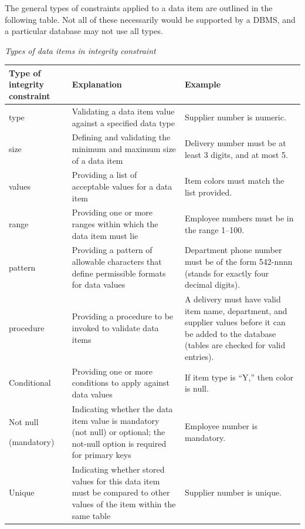 \documentclass[
]{article}
\begin{document}
The general types of constraints applied to a data item are outlined in
the following table. Not all of these necessarily would be supported by
a DBMS, and a particular database may not use all types.

\emph{Types of data items in integrity constraint}

\begin{longtable}[]{@{}
  >{\raggedright\arraybackslash}p{}
  >{\raggedright\arraybackslash}p{}
  >{\raggedright\arraybackslash}p{}@{}}
\toprule
Type of integrity
constraint & Explanation & Example \\
\midrule
\endhead
type & Validating a data
item value against a
specified data type & Supplier number is
numeric. \\
size & Defining and
validating the
minimum and maximum
size of a data item & Delivery number must
be at least 3 digits,
and at most 5. \\
values & Providing a list of
acceptable values for
a data item & Item colors must
match the list
provided. \\
range & Providing one or more
ranges within which
the data item must
lie & Employee numbers must
be in the range
1--100. \\
pattern & Providing a pattern
of allowable
characters that
define permissible
formats for data
values & Department phone
number must be of the
form 542-nnnn (stands
for exactly four
decimal digits). \\
procedure & Providing a procedure
to be invoked to
validate data items & A delivery must have
valid item name,
department, and
supplier values
before it can be
added to the database
(tables are checked
for valid entries). \\
Conditional & Providing one or more
conditions to apply
against data values & If item type is ``Y,''
then color is null. \\
Not null

(mandatory) & Indicating whether
the data item value
is mandatory (not
null) or optional;
the not-null option
is required for
primary keys & Employee number is
mandatory. \\
Unique & Indicating whether
stored values for
this data item must
be compared to other
values of the item
within the same table & Supplier number is
unique. \\
\bottomrule
\end{longtable}
\end{document}
